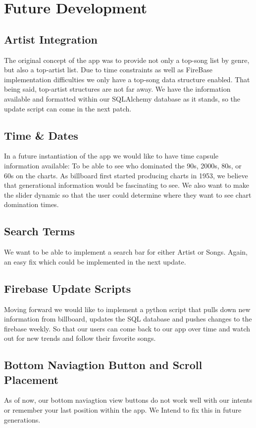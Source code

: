 \documentclass{article}
\begin{document}
\section*{Future Development}
\subsection*{Artist Integration}
The original concept of the app was to provide not only a top-song list by genre, but also a top-artist list. Due to time constraints as well as FireBase implementation difficulties we only have a top-song data structure enabled. That being said, top-artist structures are not far away. We have the information available and formatted within our SQLAlchemy database as it stands, so the update script can come in the next patch.
\subsection*{Time \& Dates}
In a future instantiation of the app we would like to have time capsule information available: To be able to see who dominated the 90s, 2000s, 80s, or 60s on the charts. As billboard first started producing charts in 1953, we believe that generational information would be fascinating to see. We also want to make the slider dynamic so that the user could determine where they want to see chart domination times. 
\subsection*{Search Terms}
We want to be able to implement a search bar for either Artist or Songs. Again, an easy fix which could be implemented in the next update.  
\subsection*{Firebase Update Scripts}
Moving forward we would like to implement a python script that pulls down new  information from billboard, updates the SQL database and pushes changes to the firebase weekly. So that our users can come back to our app over time and watch out for new trends and follow their favorite songs.
\subsection*{Bottom Naviagtion Button and Scroll Placement}
As of now, our bottom naviagtion view buttons do not work well with our intents or remember your last position within the app. We Intend to fix this in future generations.
\end{document}
